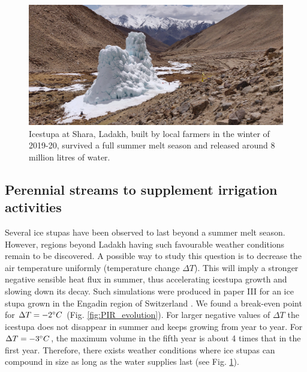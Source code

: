 \begin{figure}[htb]
  \centering
	\includegraphics[width=\textwidth]{figs/PIR_example.jpg}

  \caption{Icestupa at Shara, Ladakh, built by local farmers in the winter of 2019-20, survived a full summer melt season and released
  around 8 million litres of water.} 

\label{fig:PIR} 
\end{figure}

\subsection{Perennial streams to supplement irrigation activities}


Several ice stupas have been observed to last beyond a summer melt season. However, regions beyond Ladakh having
such favourable weather conditions remain to be discovered. A possible way to study this question is to decrease
the air temperature uniformly (temperature change $\Delta T$). This will imply a stronger negative sensible heat
flux in summer, thus accelerating icestupa growth and slowing down its decay. Such simulations were produced in
paper III for an ice stupa grown in the Engadin region of Switzerland .  We found a break-even point for $\Delta
T = -2 ^{\circ} C$ (Fig. \ref{fig:PIR_evolution}). For larger negative values of $\Delta T$ the icestupa does not disappear
in summer and keeps growing from year to year. For $\Delta T = -3 ^{\circ} C$, the maximum volume in the fifth
year is about 4 times that in the first year. Therefore, there exists weather conditions where ice stupas can
compound in size as long as the water supplies last (see Fig. \ref{fig:PIR}).


